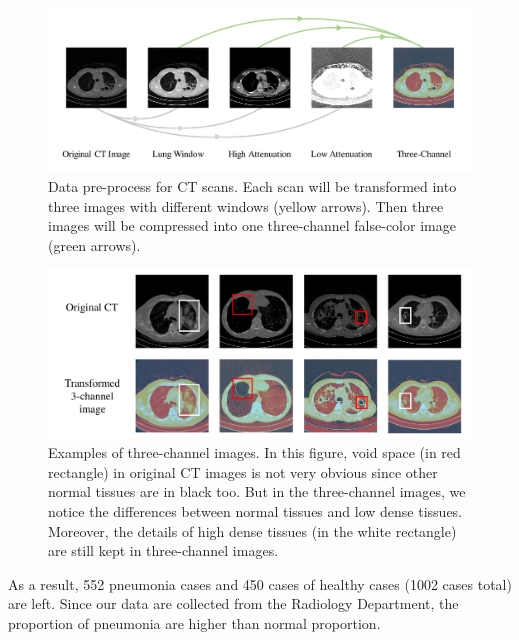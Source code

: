 \documentclass[journal]{IEEEtran}
\begin{document}
\begin{figure}[htbp]
    \centerline{\includegraphics[width=160mm]{3channel1.pdf}}
    \vspace{-0cm}
    \caption{Data pre-process for CT scans. Each scan will be transformed into three images with different windows (yellow arrows). Then three images will be compressed into one three-channel false-color image (green arrows).}
    \vspace{-0cm}
    \label{3channelprocess}

    \end{figure}

\begin{figure}[htbp]
    \centerline{\includegraphics[width=160mm]{3channel2.pdf}}
    \vspace{-0cm}
    \caption{Examples of three-channel images. In this figure, void space (in red rectangle) in original CT images is not very obvious since other normal tissues are in black too. But in the three-channel images, we notice the differences between normal tissues and low dense tissues. Moreover, the details of high dense tissues (in the white rectangle) are still kept in three-channel images.}
    \vspace{-0cm}
    \label{3channel}

    \end{figure}


As a result, 552 pneumonia cases and 450 cases of healthy cases (1002 cases total) are left. Since our data are collected from the Radiology Department, the proportion of pneumonia are higher than normal proportion.
\end{document}
